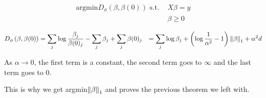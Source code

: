 \begin{align*}
    \text{argmin} D_\phi \left( \beta, \beta(0)\right) \text{ s.t. } &X\beta = y \\ 
    & \beta \geq 0 
\end{align*}

\begin{align*}
    D_\phi \left(\beta, \beta(0)\right) &= \sum_j \log \frac{\beta_j}{\beta(0)_j} 
    - \sum_j \beta_j + \sum_j \beta(0)_j 
    &= \sum_j \log \beta_j + \left(\log \frac{1}{\alpha^2} - 1\right) \norm{\beta}_1 + \alpha^2 d 
\end{align*}


As \(\alpha \to 0\), the first term is a constant, the second term goes to \(\infty\) and the last term goes to 0. 


This is why we get argmin\(\norm{\beta}_1\) and proves the previous theorem we left with. 

